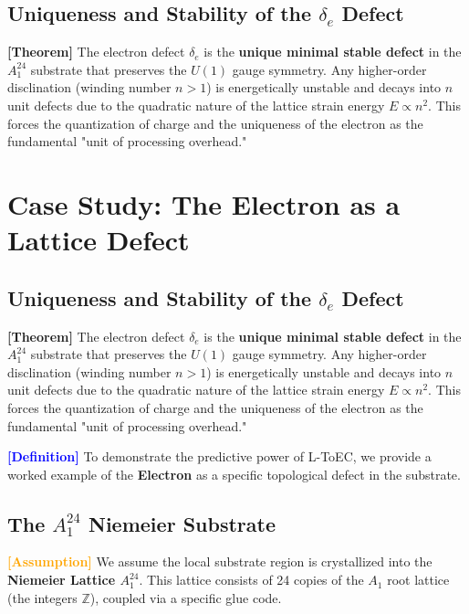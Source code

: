 \documentclass[11pt,titlepage]{article}
\newcommand{\tagdef}{\textcolor{blue}{\textbf{[Definition]}} }
\newcommand{\tagass}{\textcolor{orange}{\textbf{[Assumption]}} }
\newcommand{\tagtheo}{\textcolor{green!60!black}{\textbf{[Theorem]}} }
\begin{document}
\subsection{Uniqueness and Stability of the \texorpdfstring{$\delta_e$}{delta\_e} Defect}
\tagtheo The electron defect $\delta_e$ is the \textbf{unique minimal stable defect} in the $A_1^{24}$ substrate that preserves the $U(1)$ gauge symmetry. Any higher-order disclination (winding number $n > 1$) is energetically unstable and decays into $n$ unit defects due to the quadratic nature of the lattice strain energy $E \propto n^2$. This forces the quantization of charge and the uniqueness of the electron as the fundamental "unit of processing overhead."
\section{Case Study: The Electron as a Lattice Defect}
\subsection{Uniqueness and Stability of the $\delta_e$ Defect}
\tagtheo The electron defect $\delta_e$ is the \textbf{unique minimal stable defect} in the $A_1^{24}$ substrate that preserves the $U(1)$ gauge symmetry. Any higher-order disclination (winding number $n > 1$) is energetically unstable and decays into $n$ unit defects due to the quadratic nature of the lattice strain energy $E \propto n^2$. This forces the quantization of charge and the uniqueness of the electron as the fundamental "unit of processing overhead."

\label{sec:electron_case_study}
\tagdef To demonstrate the predictive power of L-ToEC, we provide a worked example of the \textbf{Electron} as a specific topological defect in the substrate.

\subsection{The $A_1^{24}$ Niemeier Substrate}
\tagass We assume the local substrate region is crystallized into the \textbf{Niemeier Lattice $A_1^{24}$}. This lattice consists of 24 copies of the $A_1$ root lattice (the integers $\mathbb{Z}$), coupled via a specific glue code.
\end{document}
